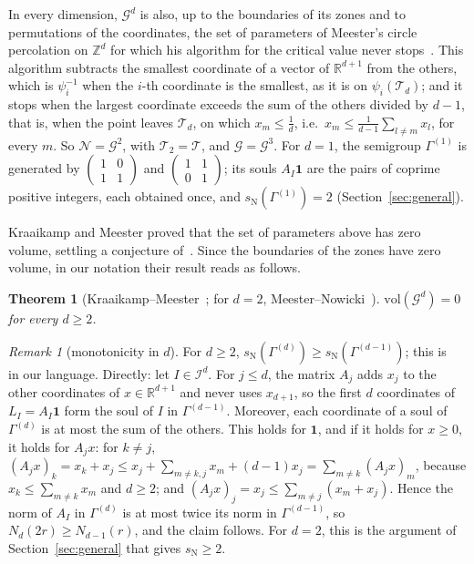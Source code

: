 \documentclass[11pt]{amsart}
\newtheorem{lettertheorem}{Theorem}%
\theoremstyle{definition}
\theoremstyle{remark}
\newtheorem{remark}[proposition]{Remark}
\newcommand{\one}{\mathbf 1}
\newcommand{\R}{\mathbb R}
\newcommand{\Z}{\mathbb Z}
\newcommand{\cN}{\mathcal N}
\newcommand{\cI}{\mathcal I}
\newcommand{\cT}{\mathcal T}
\newcommand{\cG}{\mathcal G}
\newcommand{\sN}{s_{\mathrm N}}
\begin{document}
In every dimension, $\mathcal G^d$ is also, up to the boundaries of its zones and to permutations of the coordinates, the set of parameters of Meester's circle percolation on $\Z^d$ for which his algorithm for the critical value never stops~\cite{Mee89}. This algorithm subtracts the smallest coordinate of a vector of $\R^{d+1}$ from the others, which is $\psi_i^{-1}$ when the $i$-th coordinate is the smallest, as it is on $\psi_i(\cT_d)$; and it stops when the largest coordinate exceeds the sum of the others divided by $d-1$, that is, when the point leaves $\cT_d$, on which $x_m\le\frac1d$, i.e.\ $x_m\le\frac1{d-1}\sum_{l\ne m}x_l$, for every $m$. So $\cN=\mathcal G^2$, with $\cT_2=\cT$, and $\cG=\mathcal G^3$.
For $d=1$, the semigroup $\Gamma^{(1)}$ is generated by $\begin{pmatrix}1&0\\1&1\end{pmatrix}$ and $\begin{pmatrix}1&1\\0&1\end{pmatrix}$; its souls $A_I\one$ are the pairs of coprime positive integers, each obtained once, and $\sN(\Gamma^{(1)})=2$ (Section~\ref{sec:general}).

Kraaikamp and Meester proved that the set of parameters above has zero volume, settling a conjecture of~\cite{Mee89}. Since the boundaries of the zones have zero volume, in our notation their result reads as follows.

\begin{lettertheorem}[Kraaikamp--Meester~{\cite[Lemma~1]{KM95}}; for $d=2$, Meester--Nowicki~{\cite[Thm.~5.1]{MN89}}]\label{thm:KM}
$\mathrm{vol}(\mathcal G^d)=0$ for every $d\ge2$.
\end{lettertheorem}

\begin{remark}[monotonicity in $d$]\label{rem:monotone}
For $d\ge2$, $\sN(\Gamma^{(d)})\ge\sN(\Gamma^{(d-1)})$; this is~\cite[Remark~14]{GMR19} in our language. Directly: let $I\in\cI^d$. For $j\le d$, the matrix $A_j$ adds $x_j$ to the other coordinates of $x\in\R^{d+1}$ and never uses $x_{d+1}$, so the first $d$ coordinates of $L_I=A_I\one$ form the soul of $I$ in $\Gamma^{(d-1)}$. Moreover, each coordinate of a soul of $\Gamma^{(d)}$ is at most the sum of the others. This holds for $\one$, and if it holds for $x\ge0$, it holds for $A_jx$: for $k\ne j$, $(A_jx)_k=x_k+x_j\le x_j+\sum_{m\ne k,j}x_m+(d-1)x_j=\sum_{m\ne k}(A_jx)_m$, because $x_k\le\sum_{m\ne k}x_m$ and $d\ge2$; and $(A_jx)_j=x_j\le\sum_{m\ne j}(x_m+x_j)$. Hence the norm of $A_I$ in $\Gamma^{(d)}$ is at most twice its norm in $\Gamma^{(d-1)}$, so $N_d(2r)\ge N_{d-1}(r)$, and the claim follows. For $d=2$, this is the argument of Section~\ref{sec:general} that gives $\sN\ge2$.
\end{remark}
\end{document}
